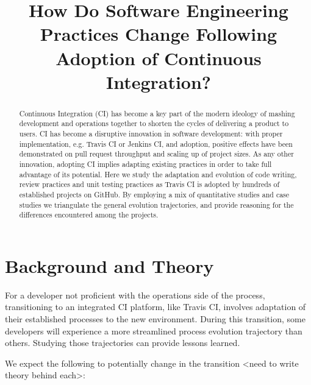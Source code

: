 \documentclass[conference]{IEEEtran}
\begin{document}
\title{How Do Software Engineering Practices
Change Following Adoption of Continuous Integration?}

\author
{
\and
{}
\and
{}
\and
{}
\and
{}
}
\maketitle
\begin{abstract}
Continuous Integration (CI) has become a key part of the modern ideology of mashing development and operations together to shorten the cycles of delivering a product to users. CI has become a disruptive innovation in software development: with proper implementation, e.g. Travis CI or Jenkins CI, and adoption, positive effects have been demonstrated on pull request throughput and scaling up of project sizes. As any other innovation, adopting CI implies adapting existing practices in order to take full advantage of its potential. Here we study the adaptation and evolution of code writing, review practices and unit testing practices as Travis CI is adopted by hundreds of established projects on GitHub. By employing a mix of quantitative studies and case studies we triangulate the general evolution trajectories, and provide reasoning for the differences encountered among the projects.
\end{abstract}




\section{Background and Theory}

For a developer not proficient with the operations side of the process, transitioning to an integrated CI platform, like Travis CI, involves adaptation of their established processes to the new environment. During this transition, some developers will experience a more streamlined process evolution trajectory than others. Studying those trajectories can provide lessons learned.


We expect the following to potentially change in the transition <need to write theory behind each>:
\end{document}
